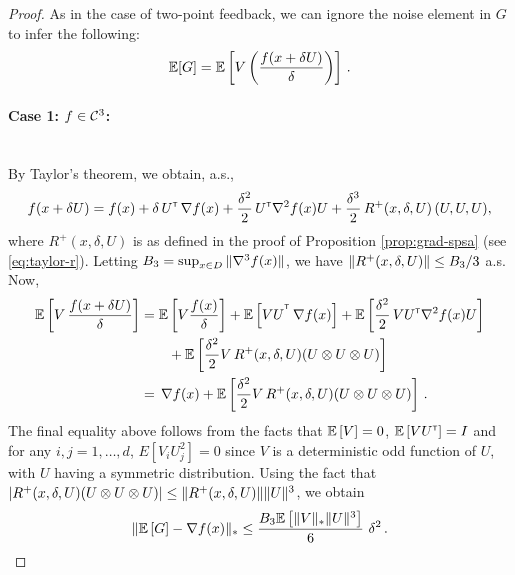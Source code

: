 \begin{proof}
As in the case of two-point feedback, we can ignore the noise element in $G$ to infer the following:
\begin{align*}
\mathbb{E}[G] =  \mathbb{E}\left[ V \left(\dfrac{f(x+\delta U) }{\delta}\right)\right] \,.
\end{align*}

\paragraph{Case 1: $f \in \mathcal{C}^3$:}\ \\
By Taylor's theorem, we obtain, a.s.,
\begin{align*}
f(x + \delta U) =
 f(x)
 +\delta\,  U^\mathsf{\scriptscriptstyle T}\,\nabla f(x)
  + \frac{\delta^2}{2}\, U^\mathsf{\scriptscriptstyle T} \nabla^2 f(x) U
  +  \frac{\delta^3}{2} \, R^{+}(x,\delta,U) \,(U, U, U),
\end{align*}
where $R^{+}(x,\delta,U)$ is as defined in the proof of Proposition \ref{prop:grad-spsa} (see \eqref{eq:taylor-r}).
Letting $B_3 = \sup_{x\in D} \| \nabla^3 f(x) \|$,%
we have $\| R^{+}(x,\delta,U)\| \le B_3/3$ a.s.
Now,
\begin{align*}
\mathbb{E}\left[V\, \dfrac{f(x+\delta U)}{\delta}\right]
&= \mathbb{E}\left[V \frac{f(x)}{\delta}\right] +  \mathbb{E}\left[VU^{^\mathsf{\scriptscriptstyle T}}
\, \nabla f(x)\right]  + \mathbb{E}\left[\frac{\delta^2}{2}\, V U^\mathsf{\scriptscriptstyle T} \nabla^2 f(x) U\right] \\
&\qquad+   \mathbb{E}\left[\frac{\delta^2}{2}  V \,R^{+}(x,\delta,U)(U \otimes U \otimes U)\right]
\\
&= \, \nabla f(x)  + \mathbb{E}\left[\frac{\delta^2}{2}  V \,R^{+}(x,\delta,U)(U \otimes U \otimes U)\right]\,.
\end{align*}
The final equality above follows from the facts that $\mathbb{E}\left[V\right] = 0$, $\mathbb{E}\left[V U^\mathsf{\scriptscriptstyle T}\right] = I$ and for any $i,j=1,\ldots,d$, $E[V_i U_j^2] = 0$ since $V$ is a deterministic odd function of $U$, with $U$ having a symmetric distribution.
Using the fact that $|R^{+}(x,\delta,U) (U \otimes U \otimes U)| \le
\|R^{+}(x,\delta,U)\| \|U\|^3$,
we obtain
\begin{align*}
\| \mathbb{E}\left[ G \right] - \nabla f(x) \|_*
\le \frac{B_3 \mathbb{E}\left[ \|V\|_* \|U\|^3 \right]}{6}\,\, \delta^2 \,.
\end{align*}


\end{proof}
